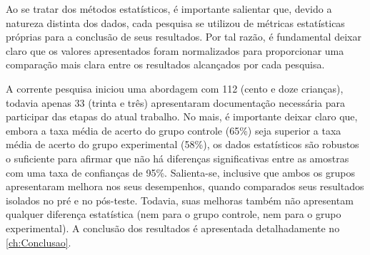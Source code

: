 Ao se tratar dos métodos estatísticos, é importante salientar que, devido a natureza distinta dos dados, cada pesquisa se utilizou de métricas estatísticas próprias para a conclusão de seus resultados. Por tal razão, é fundamental deixar claro que os valores apresentados foram normalizados para proporcionar uma comparação mais clara entre os resultados alcançados por cada pesquisa. 

A corrente pesquisa iniciou uma abordagem com 112 (cento e doze crianças), todavia apenas 33 (trinta e três) apresentaram documentação necessária para participar das etapas do atual trabalho. No mais, é importante deixar claro que, embora a taxa média de acerto do grupo controle (65\%) seja superior a taxa média de acerto do grupo experimental (58\%), os dados estatísticos são robustos o suficiente para afirmar que não há diferenças significativas entre as amostras com uma taxa de confianças de 95\%. Salienta-se, inclusive que ambos os grupos apresentaram melhora nos seus desempenhos, quando comparados seus resultados isolados no pré e no pós-teste. Todavia, suas melhoras também não apresentam qualquer diferença estatística (nem para o grupo controle, nem para o grupo experimental). A conclusão dos resultados é apresentada detalhadamente no \autoref{ch:Conclusao}.
